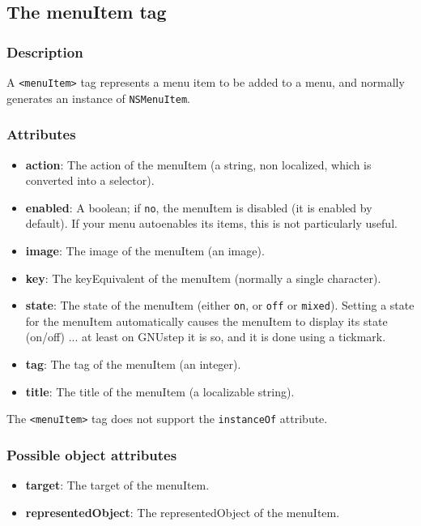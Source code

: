 \subsection{The menuItem tag}

\subsubsection{Description}
A \texttt{<menuItem>} tag represents a menu item to be added to a menu,
and normally generates an instance of \texttt{NSMenuItem}.

\subsubsection{Attributes}
\begin{itemize}
\item {\bf action}: The action of the menuItem (a string, non localized, 
which is converted into a selector).
\item {\bf enabled}: A boolean; if \texttt{no}, the menuItem is disabled (it
is enabled by default).  If your menu autoenables its items, this is not
particularly useful.
\item {\bf image}: The image of the menuItem (an image).
\item {\bf key}: The keyEquivalent of the menuItem (normally a single character).
\item {\bf state}: The state of the menuItem (either \texttt{on}, or \texttt{off} 
or \texttt{mixed}).  Setting a state for the menuItem automatically
causes the menuItem to display its state (on/off) ... at least on
GNUstep it is so, and it is done using a tickmark.
\item {\bf tag}: The tag of the menuItem (an integer).
\item {\bf title}: The title of the menuItem (a localizable string).
\end{itemize}

The \texttt{<menuItem>} tag does not support the \texttt{instanceOf} attribute.

\subsubsection{Possible object attributes}
\begin{itemize}
\item {\bf target}: The target of the menuItem.
\item {\bf representedObject}: The representedObject of the menuItem.
\end{itemize}

